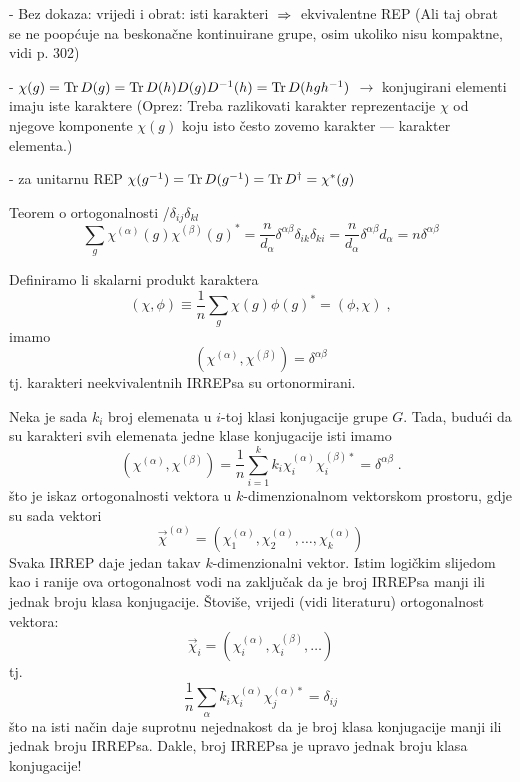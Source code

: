 - Bez dokaza: vrijedi i obrat: isti karakteri $\;\Rightarrow\;$ ekvivalentne REP
  (Ali taj obrat se ne poopćuje na beskonačne kontinuirane grupe, osim
   ukoliko nisu kompaktne, vidi \cite{Cornwell84} p. 302)

- $\chi(g)=\operatorname{Tr} D(g) = \operatorname{Tr} D(h) D(g) D^{-1}(h) = \operatorname{Tr} D(hgh^{-1})$
  $\to$ konjugirani elementi imaju iste karaktere (Oprez: Treba
  razlikovati karakter reprezentacije $\chi$ od njegove komponente
  $\chi(g)$ koju isto često zovemo karakter --- karakter elementa.)

- za unitarnu REP $\chi(g^{-1}) = \operatorname{Tr} D(g^{-1})= \operatorname{Tr} D^{\dagger}
    = \chi^{*}(g)$


Teorem o ortogonalnosti  /$\delta_{ij}\delta_{kl}$
\begin{displaymath}
\sum_g \chi^{(\alpha)}(g) \chi^{(\beta)}(g)^* = 
\frac{n}{d_{\alpha}} \delta^{\alpha\beta} \delta_{ik}\delta_{ki} =
\frac{n}{d_{\alpha}} \delta^{\alpha\beta} d_{\alpha} =
n \delta^{\alpha\beta} 
\end{displaymath}

Definiramo li skalarni produkt karaktera
 \begin{displaymath}
(\chi, \phi) \equiv \frac{1}{n} \sum_g \chi(g) \phi(g)^* = (\phi, \chi) \;,
\end{displaymath}
imamo
\begin{displaymath}
(\chi^{(\alpha)}, \chi^{(\beta)}) = \delta^{\alpha\beta}
\end{displaymath}
tj. karakteri neekvivalentnih IRREPsa su ortonormirani.

Neka je sada $k_i$ broj elemenata u $i$-toj klasi konjugacije grupe $G$.
Tada, budući da su karakteri svih elemenata jedne klase konjugacije
isti imamo
\begin{displaymath}
(\chi^{(\alpha)}, \chi^{(\beta)})=\frac{1}{n} \sum_{i=1}^{k}  k_i
 \chi^{(\alpha)}_i \chi^{(\beta)*}_{i} = \delta^{\alpha\beta} \;.
\end{displaymath}
što je iskaz ortogonalnosti vektora u $k$-dimenzionalnom vektorskom
prostoru, gdje su sada vektori
\begin{displaymath}
\vec{\chi}^{(\alpha)} = (\chi^{(\alpha)}_1, \chi^{(\alpha)}_2, \ldots,
 \chi^{(\alpha)}_{k})
\end{displaymath}
Svaka IRREP daje jedan takav $k$-dimenzionalni vektor.
Istim logičkim slijedom kao i ranije ova ortogonalnost vodi na zaključak 
da je broj
IRREPsa  manji ili jednak broju klasa konjugacije. Štoviše, vrijedi
(vidi literaturu) ortogonalnost vektora:
\begin{displaymath}
\vec{\chi}_i = (\chi^{(\alpha)}_i, \chi^{(\beta)}_i, \ldots)
\end{displaymath}
tj.
\begin{displaymath}
\frac{1}{n} \sum_{\alpha} k_i \chi^{(\alpha)}_i \chi^{(\alpha)*}_j =
\delta_{ij}
\end{displaymath}
što na isti način daje suprotnu nejednakost da je broj klasa konjugacije manji
ili jednak broju IRREPsa.
Dakle, broj IRREPsa je upravo jednak broju klasa konjugacije!

